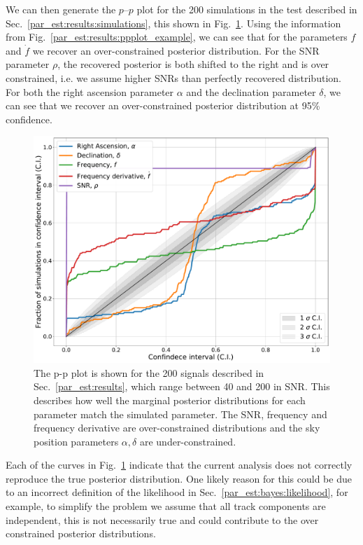 We can then generate the $p$--$p$ plot for the 200 simulations in the test described in Sec.~\ref{par_est:results:simulations}, this shown
in Fig.~\ref{par_est:results:ppplot}.  Using the information from Fig.~\ref{par_est:results:ppplot_example}, we can see that for the parameters $f$
and $\dot{f}$ we recover an over-constrained posterior
distribution.  For the \gls{SNR} parameter $\rho$, the recovered posterior is
both shifted to the right and is over constrained, i.e. we assume higher
\glspl{SNR} than perfectly recovered distribution.  For both the right
ascension parameter $\alpha$ and the declination parameter $\delta$, we can see
that we recover an over-constrained posterior distribution at 95\% confidence.  

%
\begin{figure}[ht]
    \centering
    \includegraphics[width=\linewidth]{C5_parameter/ppplot.pdf}
    \caption[p-p plot for the CW simulations]{The p-p plot is shown for the 200
signals described in Sec.~\ref{par_est:results}, which range between 40 and 200
in \gls{SNR}. This describes how well the marginal posterior distributions for
each parameter match the simulated parameter. The \gls{SNR}, frequency and
frequency derivative are over-constrained distributions and the sky position parameters
$\alpha,\delta$ are under-constrained.} \label{par_est:results:ppplot}
\end{figure}

Each of the curves in Fig.~\ref{par_est:results:ppplot} indicate that the
current analysis does not correctly reproduce the true posterior distribution.
One likely reason for this could be due to an incorrect definition of the likelihood in Sec.~\ref{par_est:bayes:likelihood}, for example, to simplify the problem we assume
that all track components are independent, this is not necessarily true and
could contribute to the over constrained posterior
distributions.

